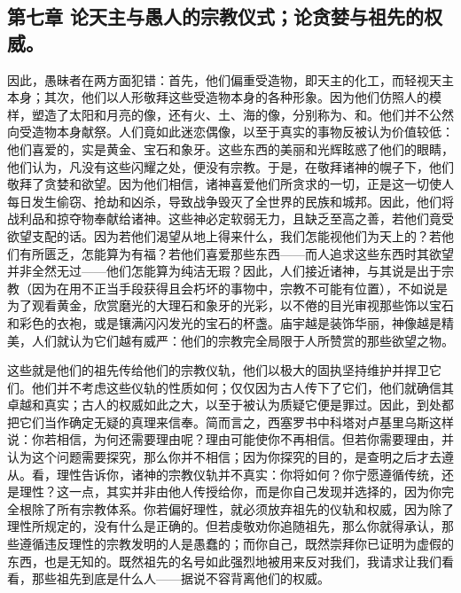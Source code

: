 
\subsection{第七章 论天主与愚人的宗教仪式；论贪婪与祖先的权威。}

因此，愚昧者在两方面犯错：首先，他们偏重受造物，即天主的化工，而轻视天主本身；其次，他们以人形敬拜这些受造物本身的各种形象。因为他们仿照人的模样，塑造了太阳和月亮的像，还有火、土、海的像，分别称为、和。他们并不公然向受造物本身献祭。人们竟如此迷恋偶像，以至于真实的事物反被认为价值较低：他们喜爱的，实是黄金、宝石和象牙。这些东西的美丽和光辉眩惑了他们的眼睛，他们认为，凡没有这些闪耀之处，便没有宗教。于是，在敬拜诸神的幌子下，他们敬拜了贪婪和欲望。因为他们相信，诸神喜爱他们所贪求的一切，正是这一切使人每日发生偷窃、抢劫和凶杀，导致战争毁灭了全世界的民族和城邦。因此，他们将战利品和掠夺物奉献给诸神。这些神必定软弱无力，且缺乏至高之善，若他们竟受欲望支配的话。因为若他们渴望从地上得来什么，我们怎能视他们为天上的？若他们有所匮乏，怎能算为有福？若他们喜爱那些东西——而人追求这些东西时其欲望并非全然无过——他们怎能算为纯洁无瑕？因此，人们接近诸神，与其说是出于宗教（因为在用不正当手段获得且会朽坏的事物中，宗教不可能有位置），不如说是为了观看黄金，欣赏磨光的大理石和象牙的光彩，以不倦的目光审视那些饰以宝石和彩色的衣袍，或是镶满闪闪发光的宝石的杯盏。庙宇越是装饰华丽，神像越是精美，人们就认为它们越有威严：他们的宗教完全局限于人所赞赏的那些欲望之物。\par

这些就是他们的祖先传给他们的宗教仪轨，他们以极大的固执坚持维护并捍卫它们。他们并不考虑这些仪轨的性质如何；仅仅因为古人传下了它们，他们就确信其卓越和真实；古人的权威如此之大，以至于被认为质疑它便是罪过。因此，到处都把它们当作确定无疑的真理来信奉。简而言之，西塞罗书中科塔对卢基里乌斯这样说：你若相信，为何还需要理由呢？理由可能使你不再相信。但若你需要理由，并认为这个问题需要探究，那么你并不相信；因为你探究的目的，是查明之后才去遵从。看，理性告诉你，诸神的宗教仪轨并不真实：你将如何？你宁愿遵循传统，还是理性？这一点，其实并非由他人传授给你，而是你自己发现并选择的，因为你完全根除了所有宗教体系。你若偏好理性，就必须放弃祖先的仪轨和权威，因为除了理性所规定的，没有什么是正确的。但若虔敬劝你追随祖先，那么你就得承认，那些遵循违反理性的宗教发明的人是愚蠢的；而你自己，既然崇拜你已证明为虚假的东西，也是无知的。既然祖先的名号如此强烈地被用来反对我们，我请求让我们看看，那些祖先到底是什么人——据说不容背离他们的权威。\par

